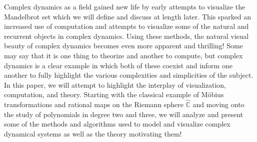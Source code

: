 \documentclass{amsart}
\newcommand{\bbC}{\mathbb{C}}
\newcommand{\bbCS}{\hat{\bbC}}
\theoremstyle{definition}
\theoremstyle{remark}
\numberwithin{equation}{section}
\begin{document}
Complex dynamics as a field gained new life by early attempts to visualize the Mandelbrot set which we will define and discuss at length later. This sparked an increased use of computation and attempts to visualize some of the natural and recurrent objects in complex dynamics. Using these methods, the natural visual beauty of complex dynamics becomes even more apparent and thrilling! Some may say that it is one thing to theorize and another to compute, but complex dynamics is a clear example in which both of these coexist and inform one another to fully highlight the various complexities and simplicities of the subject. In this paper, we will attempt to highlight the interplay of visualization, computation, and theory. Starting with the classical example of M\"{o}bius transformations and rational maps on the Riemann sphere $\bbCS$ and moving onto the study of polynomials in degree two and three, we will analyze and present some of the methods and algorithms used to model and visualize complex dynamical systems as well as the theory motivating them!







\end{document}
